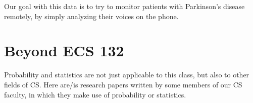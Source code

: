 \documentclass{article}
\begin{document}
Our goal with this data is to try to monitor patients with Parkinson's disease remotely, by
simply analyzing their voices on the phone.

\section{Beyond ECS 132}

Probability and statistics are not just applicable to this class, but also to other fields of CS.
Here are/is research papers written by some members of our CS faculty, in which they make use
of probability or statistics.
\end{document}
